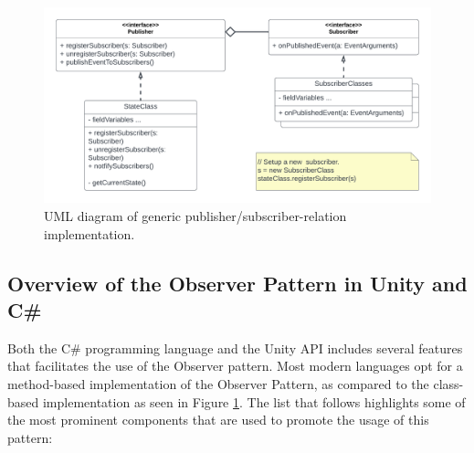     \begin{figure}[H]
      \centering
      \includegraphics[scale=0.75]{Project_report/figures/theory/design_patterns/observer_uml.png}
      \caption{UML diagram of generic publisher/subscriber-relation implementation.}
      \label{fig:subscriber-observer-uml}
    \end{figure}

\subsection{Overview of the Observer Pattern in Unity and C\#}
    Both the C\# programming language and the Unity API includes several features that facilitates the use of the Observer pattern. Most modern languages opt for a method-based implementation of the Observer Pattern, as compared to the class-based implementation as seen in Figure \ref{fig:subscriber-observer-uml}. The list that follows highlights some of the most prominent components that are used to promote the usage of this pattern:

